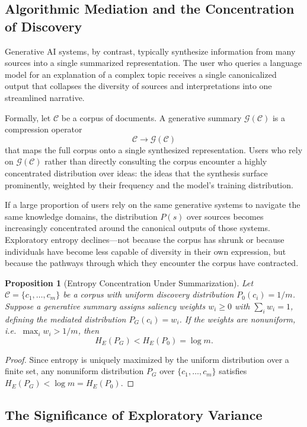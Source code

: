 \documentclass[12pt,a4paper]{article}
\theoremstyle{definition}
\theoremstyle{plain}
\newtheorem{proposition}[definition]{Proposition}
\theoremstyle{remark}
\newcommand{\HE}{H_{E}}
\newcommand{\calC}{\mathcal{C}}
\newcommand{\calG}{\mathcal{G}}
\begin{document}
\subsection{Algorithmic Mediation and the Concentration of Discovery}

Generative AI systems, by contrast, typically synthesize information from many sources into
a single summarized representation. The user who queries a language model for an explanation
of a complex topic receives a single canonicalized output that collapses the diversity of
sources and interpretations into one streamlined narrative.

Formally, let $\calC$ be a corpus of documents. A generative summary $\calG(\calC)$ is a
compression operator
\[
\calC \to \calG(\calC)
\]
that maps the full corpus onto a single synthesized representation. Users who rely on
$\calG(\calC)$ rather than directly consulting the corpus encounter a highly concentrated
distribution over ideas: the ideas that the synthesis surface prominently, weighted by their
frequency and the model's training distribution.

If a large proportion of users rely on the same generative systems to navigate the same
knowledge domains, the distribution $P(s)$ over sources becomes increasingly concentrated
around the canonical outputs of those systems. Exploratory entropy declines---not because
the corpus has shrunk or because individuals have become less capable of diversity in their
own expression, but because the pathways through which they encounter the corpus have
contracted.

\begin{proposition}[Entropy Concentration Under Summarization]
\label{prop:concentration}
Let $\calC = \{c_1, \ldots, c_m\}$ be a corpus with uniform discovery distribution
$P_0(c_i) = 1/m$. Suppose a generative summary assigns saliency weights $w_i \geq 0$
with $\sum_i w_i = 1$, defining the mediated distribution $P_G(c_i) = w_i$.
If the weights are nonuniform, i.e.\ $\max_i w_i > 1/m$, then
\[
\HE(P_G) < \HE(P_0) = \log m.
\]
\end{proposition}

\begin{proof}
Since entropy is uniquely maximized by the uniform distribution over a finite set, any
nonuniform distribution $P_G$ over $\{c_1, \ldots, c_m\}$ satisfies
$\HE(P_G) < \log m = \HE(P_0)$.
\end{proof}

\subsection{The Significance of Exploratory Variance}
\end{document}
